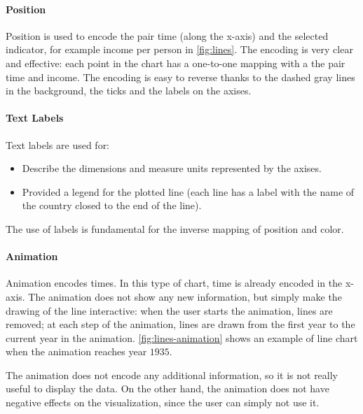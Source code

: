 \paragraph{Position}
Position is used to encode the pair time (along the x-axis) and the selected indicator, for example income per person in \cref{fig:lines}.
The encoding is very clear and effective:
each point in the chart has a one-to-one mapping with a the pair time and income.
The encoding is easy to reverse thanks to the dashed gray lines in the background, the ticks and the labels on the axises.

\paragraph{Text Labels}
Text labels are used for:
\begin{itemize}
	\item Describe the dimensions and measure units represented by the axises.
	\item Provided a legend for the plotted line (each line has a label with the name of the country closed to the end of the line).
\end{itemize}
The use of labels is fundamental for the inverse mapping of position and color.

\paragraph{Animation}
Animation encodes times.
In this type of chart, time is already encoded in the x-axis.
The animation does not show any new information, but simply make the drawing of the line interactive:
when the user starts the animation, lines are removed;
at each step of the animation, lines are drawn from the first year to the current year in the animation.
\cref{fig:lines-animation} shows an example of line chart when the animation reaches year $1935$.

The animation does not encode any additional information, so it is not really useful to display the data.
On the other hand, the animation does not have negative effects on the visualization, since the user can simply not use it.

